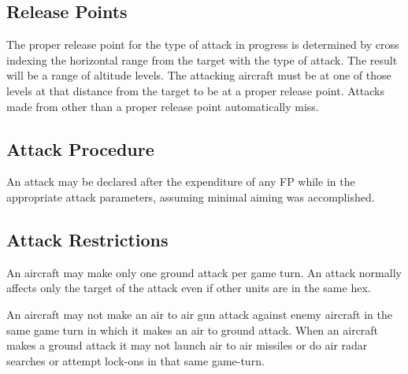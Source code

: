 \subsection{Release Points}
\label{rule:release-points}


The proper release point for the type of attack in progress is determined by cross indexing the horizontal range from the target with the type of attack. The result will be a range of altitude levels. The attacking aircraft must be at one of those levels at that distance from the target to be at a proper release point. Attacks made from other than a proper release point automatically miss.

\subsection{Attack Procedure} An attack may be declared after the expenditure of any FP while in the appropriate attack parameters, assuming minimal aiming was accomplished.

\subsection{Attack Restrictions} An aircraft may make only one ground attack per game turn. An attack normally affects only the target of the attack even if other units are in the same hex.

An aircraft may not make an air to air gun attack against enemy aircraft in the same game turn in which it makes an air to ground attack. When an aircraft makes a ground attack it may not launch air to air missiles or do air radar searches or attempt lock-ons in that same game-turn.

